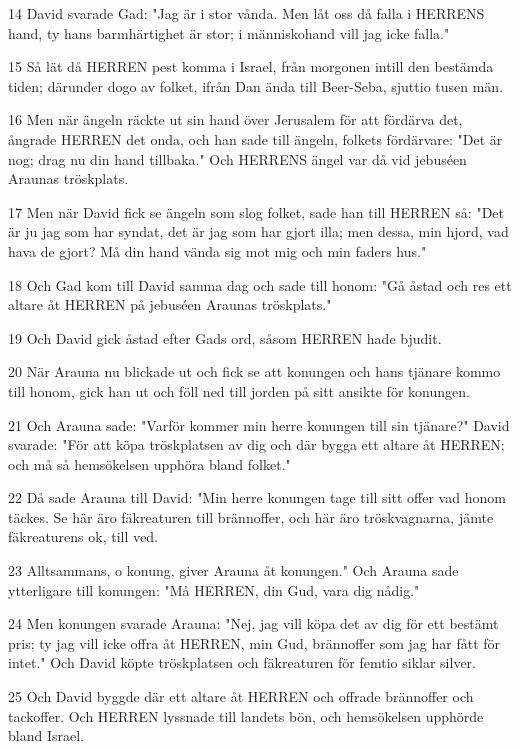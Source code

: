 \par 14 David svarade Gad: "Jag är i stor vånda. Men låt oss då falla i HERRENS hand, ty hans barmhärtighet är stor; i människohand vill jag icke falla."
\par 15 Så lät då HERREN pest komma i Israel, från morgonen intill den bestämda tiden; därunder dogo av folket, ifrån Dan ända till Beer-Seba, sjuttio tusen män.
\par 16 Men när ängeln räckte ut sin hand över Jerusalem för att fördärva det, ångrade HERREN det onda, och han sade till ängeln, folkets fördärvare: "Det är nog; drag nu din hand tillbaka." Och HERRENS ängel var då vid jebuséen Araunas tröskplats.
\par 17 Men när David fick se ängeln som slog folket, sade han till HERREN så: "Det är ju jag som har syndat, det är jag som har gjort illa; men dessa, min hjord, vad hava de gjort? Må din hand vända sig mot mig och min faders hus."
\par 18 Och Gad kom till David samma dag och sade till honom: "Gå åstad och res ett altare åt HERREN på jebuséen Araunas tröskplats."
\par 19 Och David gick åstad efter Gads ord, såsom HERREN hade bjudit.
\par 20 När Arauna nu blickade ut och fick se att konungen och hans tjänare kommo till honom, gick han ut och föll ned till jorden på sitt ansikte för konungen.
\par 21 Och Arauna sade: "Varför kommer min herre konungen till sin tjänare?" David svarade: "För att köpa tröskplatsen av dig och där bygga ett altare åt HERREN; och må så hemsökelsen upphöra bland folket."
\par 22 Då sade Arauna till David: "Min herre konungen tage till sitt offer vad honom täckes. Se här äro fäkreaturen till brännoffer, och här äro tröskvagnarna, jämte fäkreaturens ok, till ved.
\par 23 Alltsammans, o konung, giver Arauna åt konungen." Och Arauna sade ytterligare till konungen: "Må HERREN, din Gud, vara dig nådig."
\par 24 Men konungen svarade Arauna: "Nej, jag vill köpa det av dig för ett bestämt pris; ty jag vill icke offra åt HERREN, min Gud, brännoffer som jag har fått för intet." Och David köpte tröskplatsen och fäkreaturen för femtio siklar silver.
\par 25 Och David byggde där ett altare åt HERREN och offrade brännoffer och tackoffer. Och HERREN lyssnade till landets bön, och hemsökelsen upphörde bland Israel.


